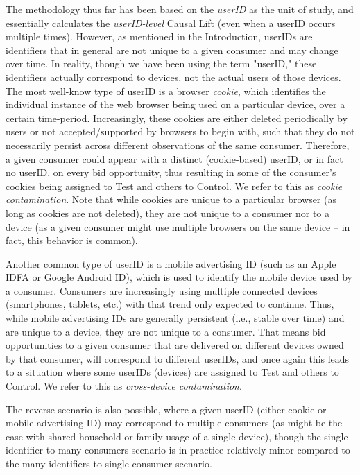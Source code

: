 \documentclass[11pt,a4paper]{article}
\theoremstyle{definition}
\theoremstyle{remark}
\theoremstyle{definition}
\theoremstyle{definition}
\theoremstyle{definition}
\theoremstyle{definition}
\theoremstyle{definition}
\theoremstyle{definition}
\begin{document}
The methodology thus far has been based on the \textit{userID} as the unit of study, and essentially calculates the \textit{userID-level} Causal Lift (even when a userID occurs multiple times). However, as mentioned in the Introduction, userIDs are identifiers that in general are not unique to a given consumer and may change over time. In reality, though we have been using the term "userID," these identifiers actually correspond to devices, not the actual users of those devices. The most well-know type of userID is a browser \textit{cookie}, which identifies the individual instance of the web browser being used on a particular device, over a certain time-period. Increasingly, these cookies are either deleted periodically by users or not accepted/supported by browsers to begin with, such that they do not necessarily persist across different observations of the same consumer. Therefore, a given consumer could appear with a distinct (cookie-based) userID, or in fact no userID, on every bid opportunity, thus resulting in some of the consumer's cookies being assigned to Test and others to Control. 
We refer to this as \textit{cookie contamination}. Note that while cookies are unique to a particular browser (as long as cookies are not deleted), they are not unique to a consumer nor to a device (as a given consumer might use multiple browsers on the same device -- in fact, this behavior is common).

Another common type of userID is a mobile advertising ID (such as an Apple IDFA or Google Android ID), which is used to identify the mobile device used by a consumer. Consumers are increasingly using multiple connected devices (smartphones, tablets, etc.) with that trend only expected to continue. Thus, while mobile advertising IDs are generally persistent (i.e., stable over time) and are unique to a device, they are not unique to a consumer. That means bid opportunities to a given consumer that are delivered on different devices owned by that consumer, will correspond to different userIDs, and once again this leads to a situation where some userIDs (devices) are assigned to Test and others to Control. We refer to this as \textit{cross-device contamination}.

The reverse scenario is also possible, where a given userID (either cookie or mobile advertising ID) may correspond to multiple consumers (as might be the case with shared household or family usage of a single device), though the single-identifier-to-many-consumers scenario is in practice relatively minor compared to the many-identifiers-to-single-consumer scenario. 
\end{document}
